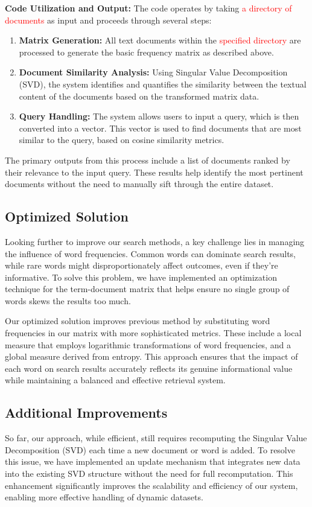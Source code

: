 \documentclass[12pt,a4paper]{article}
\begin{document}
\bigskip
\noindent \textbf{Code Utilization and Output:}
\noindent The code operates by taking \textcolor{red}{a directory of documents} as input and proceeds through several steps:
\begin{enumerate}
    \item \textbf{Matrix Generation:} All text documents within the \textcolor{red}{specified directory} are processed to generate the basic frequency matrix as described above.
    \item \textbf{Document Similarity Analysis:} Using Singular Value Decomposition (SVD), the system identifies and quantifies the similarity between the textual content of the documents based on the transformed matrix data.
    \item \textbf{Query Handling:} The system allows users to input a query, which is then converted into a vector. This vector is used to find documents that are most similar to the query, based on cosine similarity metrics.
\end{enumerate}
The primary outputs from this process include a list of documents ranked by their relevance to the input query. These results help identify the most pertinent documents without the need to manually sift through the entire dataset.


\subsection{Optimized Solution}

Looking further to improve our search methods, a key challenge lies in managing the influence of word frequencies. Common words can dominate search results, while rare words might disproportionately affect outcomes, even if they're informative. To solve this problem, we have implemented an optimization technique for the term-document matrix that helps ensure no single group of words skews the results too much.

\bigskip
\noindent Our optimized solution improves previous method by substituting word frequencies in our matrix with more sophisticated metrics. These include a local measure that employs logarithmic transformations of word frequencies, and a global measure derived from entropy. This approach ensures that the impact of each word on search results accurately reflects its genuine informational value while maintaining a balanced and effective retrieval system.


\subsection{Additional Improvements}
So far, our approach, while efficient, still requires recomputing the Singular Value Decomposition (SVD) each time a new document or word is added. To resolve this issue, we have implemented an update mechanism that integrates new data into the existing SVD structure without the need for full recomputation. This enhancement significantly improves the scalability and efficiency of our system, enabling more effective handling of dynamic datasets.
\end{document}

